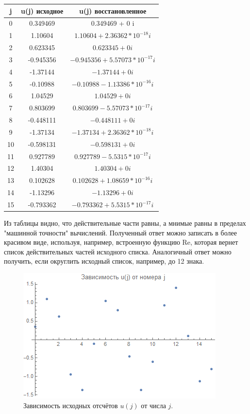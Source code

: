 \documentclass[diploma]{nanolab2015}
\begin{document}
  \begin{tabular}{|c|c|c|}
  \hline 
  j & u(j) исходное & u(j) восстановленное \\ 
  \hline 
  0 & 0.349469 & 0.349469 + 0 i\\ 
  \hline 
  1 & 1.10604 & $1.10604 + 2.36362*10^{-18} i$ \\ 
  \hline 
  2 &  0.623345 & $0.623345 + 0 i$ \\ 
  \hline 
  3 & -0.945356 & $-0.945356 + 5.57073*10^{-17} i$ \\ 
  \hline 
  4 &  -1.37144 & $-1.37144 + 0 i$ \\ 
  \hline 
  5 & -0.10988 & $-0.10988 - 1.13386*10^{-16} i$ \\ 
  \hline 
  6 &  1.04529 & $1.04529 + 0 i$ \\ 
  \hline 
  7 & 0.803699  &  $0.803699 - 5.57073*10^{-17} i$ \\ 
  \hline 
  8 & -0.448111  &  $-0.448111 + 0 i$ \\ 
  \hline 
  9 & -1.37134  &  $-1.37134 + 2.36362*10^{-18} i$ \\ 
  \hline 
  10 & -0.598131 &  $-0.598131 + 0 i$ \\ 
  \hline 
  11 &  0.927789 &  $0.927789 - 5.5315*10^{-17} i$ \\ 
  \hline 
  12 & 1.40304 & $1.40304 + 0 i$ \\ 
  \hline 
  13 & 0.102628 & $0.102628 + 1.08659*10^{-16} i$ \\ 
  \hline 
  14 & -1.13296 & $-1.13296 + 0 i$ \\ 
  \hline 
  15 & -0.793362 & $-0.793362 + 5.5315*10^{-17} i$  \\ 
  \hline 
  \end{tabular} 
  
  \vspace{0.5 cm}
  Из таблицы видно, что действительные части равны, а мнимые равны в пределах "машинной точности" вычислений. Полученный ответ можно записать в более красивом виде, используя, например, встроенную функцию Re, которая вернет список действительных частей исходного списка. Аналогичный ответ можно получить, если округлить исходный список, например, до 12 знака.
  
\begin{figure}[h!]
\centering
\includegraphics[scale=1.1]{1.png}
\caption{\label{pic2}Зависимость исходных отсчётов $u(j)$ от числа $j$.}
\end{figure}
\end{document}
